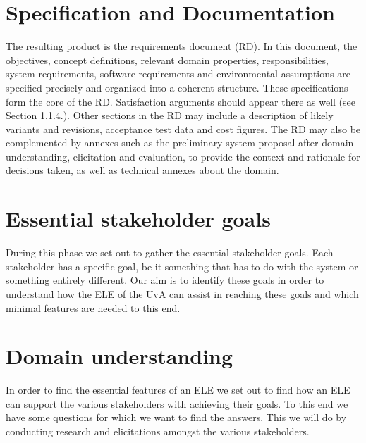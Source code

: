 \chapter{Specification and Documentation}
The resulting product is the requirements document (RD). In this document, the objectives,
concept definitions, relevant domain properties, responsibilities, system requirements, software
requirements and environmental assumptions are specified precisely and organized into a
coherent structure. These specifications form the core of the RD. Satisfaction arguments should
appear there as well (see Section 1.1.4.). Other sections in the RD may include a description
of likely variants and revisions, acceptance test data and cost figures. The RD may also be
complemented by annexes such as the preliminary system proposal after domain understanding,
elicitation and evaluation, to provide the context and rationale for decisions taken, as well as
technical annexes about the domain. 

\chapter{Essential stakeholder goals}\label{stakeholder_goals}
During this phase we set out to gather the essential stakeholder goals. Each stakeholder has a specific goal, be it something that has to do with the system or something entirely different. Our aim is to identify these goals in order to understand how the ELE of the UvA can assist in reaching these goals and which minimal features are needed to this end.



\chapter{Domain understanding}
\label{ch:understanding} 
In order to find the essential features of an ELE we set out to find how an ELE can support the various stakeholders with achieving their goals. To this end we have some questions for which we want to find the answers. This we will do by conducting research and elicitations amongst the various stakeholders.

